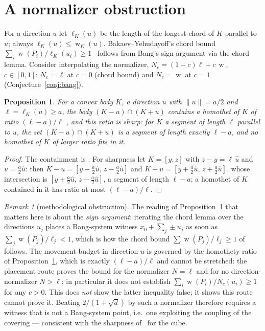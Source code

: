 \documentclass{aims}
\numberwithin{equation}{section}
\theoremstyle{plain}
\newtheorem{proposition}[theorem]{Proposition}
\theoremstyle{definition}
\theoremstyle{remark}
\newtheorem{remark}[theorem]{Remark}
\DeclareMathOperator{\wid}{w}
\begin{document}
\section{A normalizer obstruction}\label{sec:nogo}
For a direction $u$ let $\ell_K(u)$ be the length of the longest chord of $K$
parallel to $u$; always $\ell_K(u)\le\wid_K(u)$. Bakaev--Yehudayoff's chord bound
$\sum_i\wid(P_i)/\ell_K(u_i)\ge1$~\cite{BY26} follows from Bang's sign argument
via the chord lemma. Consider interpolating the normalizer,
$N_c=(1-c)\ell+c\,\wid$, $c\in[0,1]$: $N_c=\ell$ at $c=0$ (chord bound) and
$N_c=\wid$ at $c=1$ (Conjecture~\ref{conj:bang}).
\begin{proposition}\label{thm:nogo}
For a convex body $K$, a direction $u$ with $\|u\|=a/2$ and
$\ell=\ell_K(u)\ge a$, the body $(K-u)\cap(K+u)$ contains a homothet of $K$ of
ratio $(\ell-a)/\ell$ \cite[Lem.~2.3]{Verreault}, and this ratio is sharp: for
$K$ a segment of length $\ell$ parallel to $u$, the set $(K-u)\cap(K+u)$ is a
segment of length exactly $\ell-a$, and no homothet of $K$ of larger ratio fits
in it.
\end{proposition}
\begin{proof}
The containment is \cite[Lem.~2.3]{Verreault}. For sharpness let
$K=[y,z]$ with $z-y=\ell\,\hat u$ and $u=\tfrac a2\hat u$: then
$K-u=[y-\tfrac a2\hat u,\,z-\tfrac a2\hat u]$ and
$K+u=[y+\tfrac a2\hat u,\,z+\tfrac a2\hat u]$, whose intersection is
$[y+\tfrac a2\hat u,\,z-\tfrac a2\hat u]$, a segment of length $\ell-a$; a
homothet of $K$ contained in it has ratio at most $(\ell-a)/\ell$.
\end{proof}
\begin{remark}[methodological obstruction]\label{rem:nogo}
The reading of Proposition~\ref{thm:nogo} that matters here is about the
\emph{sign argument}: iterating the chord lemma over the directions $u_j$
places a Bang-system witness $x_0+\sum_j\pm u_j$ as soon as
$\sum_j\wid(P_j)/\ell_j<1$, which is how the chord bound
$\sum\wid(P_j)/\ell_j\ge1$ of~\cite{BY26} follows. The movement budget in
direction $u$ is governed by the homothety ratio of
Proposition~\ref{thm:nogo}, which is exactly $(\ell-a)/\ell$ and cannot be
stretched: the placement route proves the bound for the normalizer
$N=\ell$ and for no direction-normalizer $N>\ell$; in particular it does not
establish $\sum_i\wid(P_i)/N_c(u_i)\ge1$ for any $c>0$. This does \emph{not}
show the latter inequality false; it shows this route cannot prove it. Beating
$2/(1+\sqrt d)$ by such a normalizer therefore requires a witness that is not a
Bang-system point, i.e.\ one exploiting the coupling of the covering ---
consistent with the sharpness of~\cite{BY26} for the cube.
\end{remark}
\end{document}

